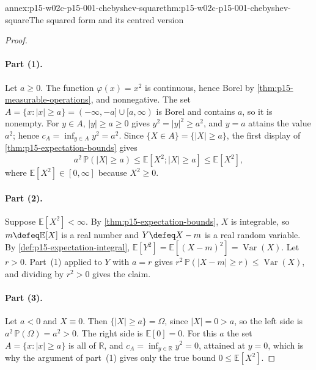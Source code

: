 \begin{annexitem}{annex:p15-w02c-p15-001-chebyshev-square}{thm:p15-w02c-p15-001-chebyshev-square}{The squared form and its centred version}
\begin{proof}
\paragraph{Part (1).}
Let \(a\geq0\). The function \(\varphi(x)=x^2\) is continuous, hence
Borel by \cref{thm:p15-measurable-operations}, and nonnegative. The set
\(A=\{x:|x|\geq a\}=(-\infty,-a]\cup[a,\infty)\) is Borel and contains
\(a\), so it is nonempty. For \(y\in A\), \(|y|\geq a\geq0\) gives
\(y^2=|y|^2\geq a^2\), and \(y=a\) attains the value \(a^2\); hence
\(c_A=\inf_{y\in A}y^2=a^2\). Since \(\{X\in A\}=\{|X|\geq a\}\), the
first display of \cref{thm:p15-expectation-bounds} gives
\[
 a^2\,\mathbb P(|X|\geq a)\leq\mathbb E[X^2;|X|\geq a]\leq\mathbb E[X^2],
\]
where \(\mathbb E[X^2]\in[0,\infty]\) because \(X^2\geq0\).

\paragraph{Part (2).}
Suppose \(\mathbb E[X^2]<\infty\). By \cref{thm:p15-expectation-bounds},
\(X\) is integrable, so \(m\defeq\mathbb E[X]\) is a real number and
\(Y\defeq X-m\) is a real random variable. By
\cref{def:p15-expectation-integral},
\(\mathbb E[Y^2]=\mathbb E[(X-m)^2]=\operatorname{Var}(X)\). Let \(r>0\).
Part~(1) applied to \(Y\) with \(a=r\) gives
\(r^2\,\mathbb P(|X-m|\geq r)\leq\operatorname{Var}(X)\), and dividing by
\(r^2>0\) gives the claim.

\paragraph{Part (3).}
Let \(a<0\) and \(X\equiv0\). Then \(\{|X|\geq a\}=\Omega\), since
\(|X|=0>a\), so the left side is \(a^2\,\mathbb P(\Omega)=a^2>0\). The
right side is \(\mathbb E[0]=0\). For this \(a\) the set
\(A=\{x:|x|\geq a\}\) is all of \(\mathbb R\), and
\(c_A=\inf_{y\in\mathbb R}y^2=0\), attained at \(y=0\), which is why the
argument of part~(1) gives only the true bound \(0\leq\mathbb E[X^2]\).
\end{proof}
\end{annexitem}

